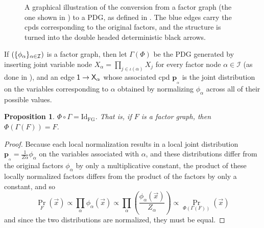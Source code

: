 \documentclass{article}
\theoremstyle{plain}
\newtheorem{prop}[theorem]{Proposition}
\theoremstyle{definition}
\theoremstyle{remark}
\newcommand\mat[1]{\mathbf{#1}}
\newcommand{\bp}[1][L]{\mat{p}_{\!_{#1}\!}}
\newcommand\PDGof{\Gamma}
\numberwithin{equation}{section}
\begin{document}
\begin{figure}[htb]
{}
		
		\caption{A graphical illustration of the conversion from a factor graph (the one shown in ) to a PDG, as defined in . The blue edges carry the cpds corresponding to the original factors, and the structure is turned into the double headed deterministic black arrows.}
		\label{fig:fg2PDG}
	\end{figure}

	\begin{defn} \label{def:fg2PDG}
		If $(\{\phi_\alpha\}_{\alpha \in \cal I})$ is a factor graph, then let $\PDGof(\Phi)$ be the PDG generated by inserting joint variable node $X_\alpha = \prod_{j \in \iota(\alpha)} X_j$ for every factor node $\alpha \in \mathcal I$ (as done in ), and an edge $\sf 1 \to X_\alpha$ whose associated cpd $\bp[\alpha]$ is the joint distribution on the variables corresponding to $\alpha$ obtained by normalizing $\phi_\alpha$ across all of their possible values.%
	\end{defn}

	\begin{prop}\label{prop:fg-pdg-lossless}
		$\Phi \circ \PDGof = \mathrm{Id}_{\text{FG}}$. That is, if $F$ is a factor graph, then $\Phi(\PDGof(F)) = F$.
	\end{prop}
	\begin{proof}
		Because each local normalization results in a local joint
				distribution $\bp[\alpha] = \frac{1}{Z\alpha}
				\phi_\alpha$ on the variables associated with $\alpha$, and these distributions differ from the original factors $\phi_\alpha$ by only a multiplicative 
			   constant, the product of these locally normalized factors differs from the product of the factors by only a constant, and so 
		\[ \Pr_F(\vec x) \propto \prod_\alpha \phi_\alpha(\vec x) \propto \prod_\alpha \left(\frac{\phi_\alpha(\vec x)}{Z_\alpha}\right) \propto \Pr_{\Phi(\PDGof(F))}(\vec x) \]
		and since the two distributions are normalized, they must be equal.
	\end{proof}
\end{document}
